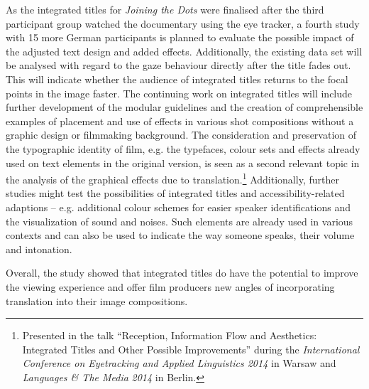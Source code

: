 \documentclass[output=paper]{langsci/langscibook}
\begin{document}
As the integrated titles for \textit{Joining the Dots} were finalised after the third participant group watched the documentary using the eye tracker, a fourth study with 15 more German participants is planned to evaluate the possible impact of the adjusted text design and added effects. Additionally, the existing data set will be analysed with regard to the gaze behaviour directly after the title fades out. This will indicate whether the audience of integrated titles returns to the focal points in the image faster. The continuing work on integrated titles will include further development of the modular guidelines and the creation of comprehensible examples of placement and use of effects in various shot compositions without a graphic design or filmmaking background. The consideration and preservation of the typographic identity of film, e.g. the typefaces, colour sets and effects already used on text elements in the original version, is seen as a second relevant topic in the analysis of the graphical effects due to translation.\footnote{Presented in the talk ``Reception, Information Flow and Aesthetics: Integrated Titles and Other Possible Improvements'' during the \textit{International Conference on Eyetracking and Applied Linguistics 2014} in Warsaw and \textit{Languages \& The Media} \textit{2014} in Berlin.} Additionally, further studies might test the possibilities of integrated titles and accessibility-related adaptions -- e.g. additional colour schemes for easier speaker identifications and the visualization of sound and noises. Such elements are already used in various contexts and can also be used to indicate the way someone speaks, their volume and intonation.



Overall, the study showed that integrated titles do have the potential to improve the viewing experience and offer film producers new angles of incorporating translation into their image compositions.
\end{document}
